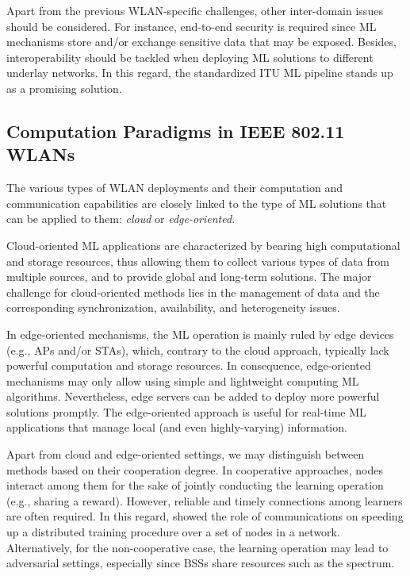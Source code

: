 \documentclass[journal]{IEEEtran}
\begin{document}
Apart from the previous WLAN-specific challenges, other inter-domain issues should be considered. For instance, end-to-end security is required since ML mechanisms store and/or exchange sensitive data that may be exposed. Besides, interoperability should be tackled when deploying ML solutions to different underlay networks. In this regard, the standardized ITU ML pipeline stands up as a promising solution.

\subsection{Computation Paradigms in IEEE 802.11 WLANs}
The various types of WLAN deployments and their computation and communication capabilities are closely linked to the type of ML solutions that can be applied to them: \emph{cloud} or \emph{edge-oriented}.

Cloud-oriented ML applications are characterized by
bearing high computational and storage resources, thus allowing them to collect various types of data from multiple sources, and to provide global and long-term solutions. The major challenge for cloud-oriented methods lies in the management of data and the corresponding synchronization, availability, and heterogeneity issues.

In edge-oriented mechanisms, the ML operation is mainly ruled by edge devices (e.g., APs and/or STAs), which, contrary to the cloud approach, typically lack powerful computation and storage resources. In consequence, edge-oriented mechanisms may only allow using simple and lightweight computing ML algorithms. Nevertheless, edge servers can be added to deploy more powerful solutions promptly. The edge-oriented approach is useful for real-time ML applications that manage local (and even highly-varying) information.

Apart from cloud and edge-oriented settings, we may distinguish between methods based on their cooperation degree. In cooperative approaches, nodes interact among them for the sake of jointly conducting the learning operation (e.g., sharing a reward). However, reliable and timely connections among learners are often required. In this regard, \cite{lin2017deep} showed the role of communications on speeding up a distributed training procedure over a set of nodes in a network. Alternatively, for the non-cooperative case, the learning operation may lead to adversarial settings, especially since BSSs share resources such as the spectrum.
\end{document}
